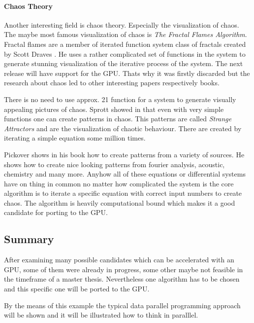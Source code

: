 \paragraph{Chaos Theory} %
\label{par:chaos_theory}
Another interesting field is chaos theory. Especially the visualization of
chaos. The maybe most famous visualization of chaos is \emph{The Fractal Flames
Algorithm}. Fractal flames are a member of iterated function system class of
fractals created by Scott Draves \citep{citeulike:3801950}. He uses a rather
complicated set of functions in the system to generate stunning visualization of
the iterative process of the system. The next release will have support for the
GPU. Thats why it was firstly discarded but the research about chaos led to
other interesting papers respectively books.

There is no need to use approx. 21 function for a system to generate visually
appealing pictures of chaos. Sprott showed in \citep{citeulike:3745535} that even
with very simple functions one can create patterns in chaos. This patterns are
called \emph{Strange Attractors} and are the visualization of chaotic behaviour.
There are created by iterating a simple equation some million times. 

Pickover shows in his book \citep{citeulike:3812233} how to create patterns from
a variety of sources. He shows how to create nice looking patterns from fourier
analysis, acoustic, chemistry and many more. Anyhow all of these equations or
differential systems have on thing in common no matter how complicated the
system is the core algorithm is to iterate a specific equation with correct
input numbers to create chaos. The algorithm is heavily computational bound
which makes it a good candidate for porting to the GPU.
\subsection*{Summary} %
\label{ssub:summary}
After examining many possible candidates which can be accelerated with an GPU,
some of them were already in progress, some other maybe not feasible in the
timeframe of a master thesis. Nevertheless one algorithm has to be chosen and
this specific one will be ported to the GPU.

By the means of this example the typical data parallel programming approach will
be shown and it will be illustrated how to think in paralllel.
